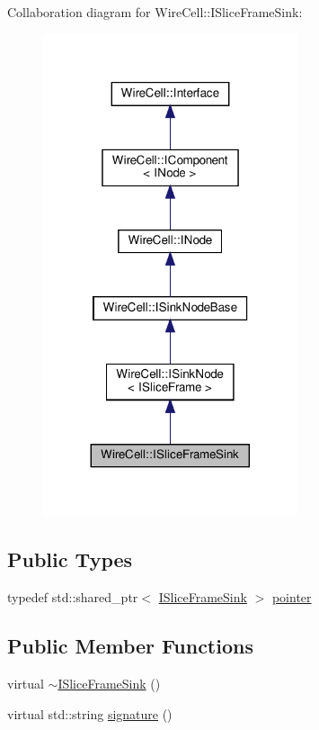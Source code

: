 Collaboration diagram for Wire\+Cell\+:\+:I\+Slice\+Frame\+Sink\+:
\nopagebreak
\begin{figure}[H]
\begin{center}
\leavevmode
\includegraphics[width=212pt]{class_wire_cell_1_1_i_slice_frame_sink__coll__graph}
\end{center}
\end{figure}
\subsection*{Public Types}
\begin{DoxyCompactItemize}
\item 
typedef std\+::shared\+\_\+ptr$<$ \hyperlink{class_wire_cell_1_1_i_slice_frame_sink}{I\+Slice\+Frame\+Sink} $>$ \hyperlink{class_wire_cell_1_1_i_slice_frame_sink_a4cc331e8866097c1e1e0fbf98f925a0b}{pointer}
\end{DoxyCompactItemize}
\subsection*{Public Member Functions}
\begin{DoxyCompactItemize}
\item 
virtual \hyperlink{class_wire_cell_1_1_i_slice_frame_sink_aa20950dee968a313fb413b70c3a94d4e}{$\sim$\+I\+Slice\+Frame\+Sink} ()
\item 
virtual std\+::string \hyperlink{class_wire_cell_1_1_i_slice_frame_sink_acbe280d082cb788d8101afe67e0f2eaf}{signature} ()
\end{DoxyCompactItemize}


